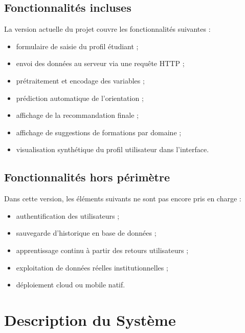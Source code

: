 \documentclass[12pt,a4paper]{report}
\begin{document}
\section{Fonctionnalités incluses}
La version actuelle du projet couvre les fonctionnalités suivantes :
\begin{itemize}[label=--]
    \item formulaire de saisie du profil étudiant ;
    \item envoi des données au serveur via une requête HTTP ;
    \item prétraitement et encodage des variables ;
    \item prédiction automatique de l'orientation ;
    \item affichage de la recommandation finale ;
    \item affichage de suggestions de formations par domaine ;
    \item visualisation synthétique du profil utilisateur dans l'interface.
\end{itemize}

\section{Fonctionnalités hors périmètre}
Dans cette version, les éléments suivants ne sont pas encore pris en charge :
\begin{itemize}[label=--]
    \item authentification des utilisateurs ;
    \item sauvegarde d'historique en base de données ;
    \item apprentissage continu à partir des retours utilisateurs ;
    \item exploitation de données réelles institutionnelles ;
    \item déploiement cloud ou mobile natif.
\end{itemize}

\chapter{Description du Système}
\end{document}
